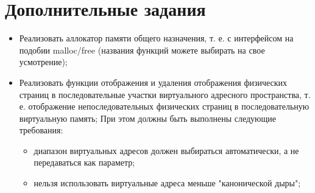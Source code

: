 \section{Дополнительные задания}

\begin{itemize}
  \item Реализовать аллокатор памяти общего назначения, т. е. с интерфейсом на
        подобии malloc/free (названия функций можете выбирать на свое
        усмотрение);
  \item Реализовать функции отображения и удаления отображения физических страниц
        в последовательные участки виртуального адресного пространства, т. е.
        отображение непоследовательных физических страниц в последовательную
        виртуальную память; При этом должны быть выполнены следующие требования:
        \begin{itemize}
          \item диапазон виртуальных адресов должен выбираться автоматически, а не
                передаваться как параметр;
          \item нельзя использовать виртуальные адреса меньше "канонической дыры";
        \end{itemize}
\end{itemize}
